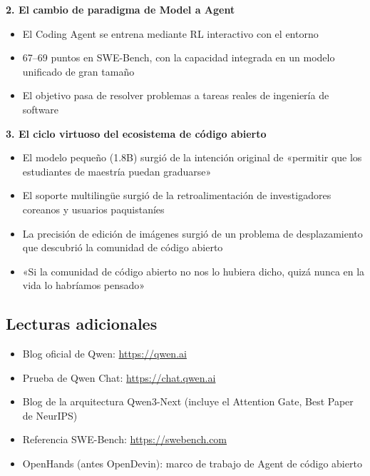 \documentclass[a4paper]{article}
\begin{document}
\textbf{2. El cambio de paradigma de Model a Agent}
\begin{itemize}
    \item El Coding Agent se entrena mediante RL interactivo con el entorno
    \item 67--69 puntos en SWE-Bench, con la capacidad integrada en un modelo unificado de gran tamaño
    \item El objetivo pasa de resolver problemas a tareas reales de ingeniería de software
\end{itemize}

\textbf{3. El ciclo virtuoso del ecosistema de código abierto}
\begin{itemize}
    \item El modelo pequeño (1.8B) surgió de la intención original de «permitir que los estudiantes de maestría puedan graduarse»
    \item El soporte multilingüe surgió de la retroalimentación de investigadores coreanos y usuarios paquistaníes
    \item La precisión de edición de imágenes surgió de un problema de desplazamiento que descubrió la comunidad de código abierto
    \item «Si la comunidad de código abierto no nos lo hubiera dicho, quizá nunca en la vida lo habríamos pensado»
\end{itemize}

\subsection{Lecturas adicionales}

\begin{itemize}
    \item Blog oficial de Qwen: \url{https://qwen.ai}
    \item Prueba de Qwen Chat: \url{https://chat.qwen.ai}
    \item Blog de la arquitectura Qwen3-Next (incluye el Attention Gate, Best Paper de NeurIPS)
    \item Referencia SWE-Bench: \url{https://swebench.com}
    \item OpenHands (antes OpenDevin): marco de trabajo de Agent de código abierto
\end{itemize}

\end{document}
